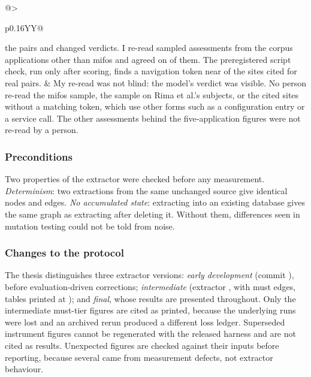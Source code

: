\begin{table}[!htbp]
\begin{tabularx}{\textwidth}{@{}>{\raggedright\arraybackslash}p{}YY@{}}
the \HHRead{} pairs and changed \HHGateChanged{} verdicts. I re-read \HHAuthorJudged{} sampled
assessments from the corpus applications other than mifos and agreed on \HHAuthorAgree{} of them. The
preregistered script check, run only after scoring, finds a navigation token near
\HHSitesToken{} of the \HHReadReal{} sites cited for real pairs. & My re-read was not blind: the
model's verdict was visible. No person re-read the mifos sample, the sample on Rima et al.'s
subjects, or the \HHSitesNoToken{} cited sites without a matching token, which use other forms such
as a configuration entry or a service call. The other assessments behind the five-application figures were not re-read by a person. \\
\bottomrule
\end{tabularx}
\end{table}

\subsubsection{Preconditions}

Two properties of the extractor were checked before any measurement. \emph{Determinism}: two
extractions from the same unchanged source give identical nodes and edges. \emph{No accumulated
state}: extracting into an existing database gives the same graph as extracting after deleting it.
Without them, differences seen in mutation testing could not be told from noise.

\subsubsection{Changes to the protocol}
\label{sec:corrections}
\label{app:repairs}
\label{app:validation}

The thesis distinguishes three extractor versions: \emph{early development} (commit
\EarlierCommit{}), before evaluation-driven corrections; \emph{intermediate} (extractor
\RoundExtractor{}, with \RoundMustEdges{} must edges, tables printed at \RoundCommit{}); and
\emph{final}, whose results are presented throughout. Only the intermediate must-tier figures are
cited as printed, because the underlying runs were lost and an archived rerun produced a different
loss ledger. Superseded instrument figures cannot be regenerated with the released harness and are
not cited as results. Unexpected figures are checked against their inputs before reporting, because
several came from measurement defects, not extractor behaviour.


